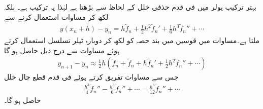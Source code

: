 بہتر ترکیب یولر میں فی قدم حذفی خلل  کے لحاظ سے بڑھتا ہے لہٰذا یہ ترکیب  ہے۔ بلکہ  لکھ کر  مساوات  استعمال کرنے سے
\begin{align}\label{مساوات_اعدادی_بہتر_یولر_پ}
y(x_n+h)-y_n=h\tilde{f}_n+\frac{1}{2}h^2\tilde{f}_n'+\frac{1}{6}h^3\tilde{f}_n''+\cdots
\end{align}
ملتا ہے۔مساوات  میں قوسین میں بند حصہ کو  لکھ کر دوبارہ ٹیلر تسلسل استعمال کرتے ہوئے مساوات  سے  درج ذیل حاصل ہو گا 
\begin{align}\label{مساوات_اعدادی_بہتر_یولر_ت}
y_{n+1}-y_n\approx \frac{1}{2}h(\tilde{f}_n+\tilde{f}_n+h\tilde{f}_n'+\frac{1}{2}h^2\tilde{f}_n''+\cdots)
\end{align}
جس سے مساوات  تفریق کرتے ہوئے فی قدم قطع  چال خلل
\begin{align*}
\frac{h^3}{4}\tilde{f}_n''-\frac{h^3}{6}\tilde{f}_n''+\cdots=\frac{h^3}{12}\tilde{f}_n''+\cdots
\end{align*}
حاصل ہو گا۔ 

